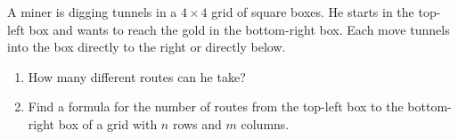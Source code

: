 A miner is digging tunnels in a $4\times4$ grid of square boxes. He starts in the top-left box and wants to reach the gold in the bottom-right box. Each move tunnels into the box directly to the right or directly below.
\begin{enumerate}
\item[(a)] How many different routes can he take?
\item[(b)] Find a formula for the number of routes from the top-left box to the bottom-right box of a grid with $n$ rows and $m$ columns.
\end{enumerate}
